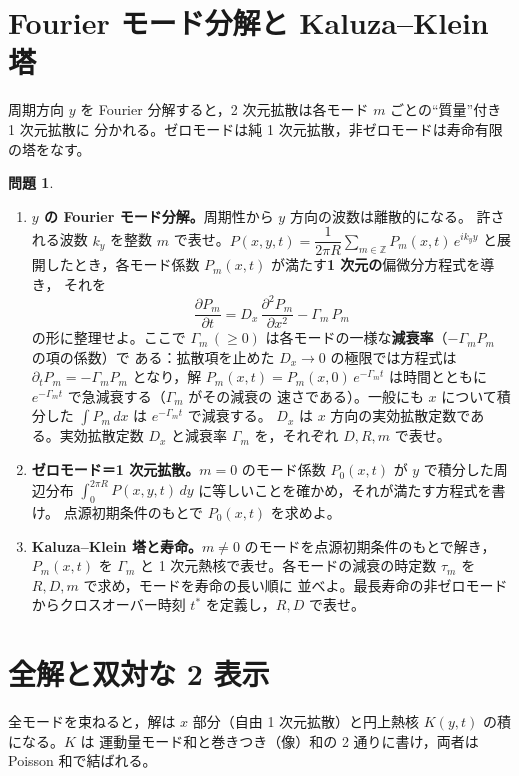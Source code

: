 \documentclass[dvipdfmx, uplatex]{jsarticle}
\theoremstyle{definition}
\newtheorem*{prob}{問題}
\begin{document}
\section{Fourier モード分解と Kaluza--Klein 塔}
周期方向 $y$ を Fourier 分解すると，2 次元拡散は各モード $m$ ごとの``質量''付き 1 次元拡散に
分かれる。ゼロモードは純 1 次元拡散，非ゼロモードは寿命有限の塔をなす。

\begin{prob}
\begin{enumerate}[start=10]
\item \textbf{$y$ の Fourier モード分解。}周期性から $y$ 方向の波数は離散的になる。
許される波数 $k_y$ を整数 $m$ で表せ。$P(x,y,t)=\dfrac{1}{2\pi R}\displaystyle\sum_{m\in\mathbb{Z}}
P_m(x,t)\,e^{ik_y y}$ と展開したとき，各モード係数 $P_m(x,t)$ が満たす\textbf{1 次元の}偏微分方程式を導き，
それを
\[
    \frac{\partial P_m}{\partial t}=D_x\,\frac{\partial^2 P_m}{\partial x^2}-\Gamma_m\,P_m
\]
の形に整理せよ。ここで $\Gamma_m\,(\ge0)$ は各モードの一様な\textbf{減衰率}（$-\Gamma_m P_m$ の項の係数）で
ある：拡散項を止めた $D_x\to0$ の極限では方程式は $\partial_t P_m=-\Gamma_m P_m$ となり，解
$P_m(x,t)=P_m(x,0)\,e^{-\Gamma_m t}$ は時間とともに $e^{-\Gamma_m t}$ で急減衰する（$\Gamma_m$ がその減衰の
速さである）。一般にも $x$ について積分した $\displaystyle\int P_m\,dx$ は $e^{-\Gamma_m t}$ で減衰する。
$D_x$ は $x$ 方向の実効拡散定数である。実効拡散定数 $D_x$ と減衰率 $\Gamma_m$ を，それぞれ $D,R,m$ で表せ。
\item \textbf{ゼロモード＝1 次元拡散。}$m=0$ のモード係数 $P_0(x,t)$ が $y$ で積分した周辺分布
$\displaystyle\int_0^{2\pi R}P(x,y,t)\,dy$ に等しいことを確かめ，それが満たす方程式を書け。
点源初期条件のもとで $P_0(x,t)$ を求めよ。
\item \textbf{Kaluza--Klein 塔と寿命。}$m\neq0$ のモードを点源初期条件のもとで解き，$P_m(x,t)$ を
$\Gamma_m$ と 1 次元熱核で表せ。各モードの減衰の時定数 $\tau_m$ を $R,D,m$ で求め，モードを寿命の長い順に
並べよ。最長寿命の非ゼロモードからクロスオーバー時刻 $t^\ast$ を定義し，$R,D$ で表せ。
\end{enumerate}
\end{prob}

\section{全解と双対な 2 表示}
全モードを束ねると，解は $x$ 部分（自由 1 次元拡散）と円上熱核 $K(y,t)$ の積になる。$K$ は
運動量モード和と巻きつき（像）和の 2 通りに書け，両者は Poisson 和で結ばれる。
\end{document}
